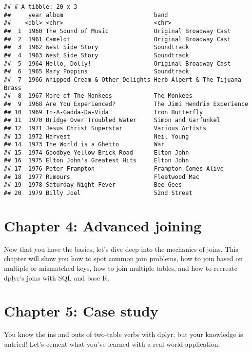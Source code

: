 \documentclass[]{article}
\begin{document}
\begin{verbatim}
## # A tibble: 20 x 3
##     year album                          band                           
##    <dbl> <chr>                          <chr>                          
##  1  1960 The Sound of Music             Original Broadway Cast         
##  2  1961 Camelot                        Original Broadway Cast         
##  3  1962 West Side Story                Soundtrack                     
##  4  1963 West Side Story                Soundtrack                     
##  5  1964 Hello, Dolly!                  Original Broadway Cast         
##  6  1965 Mary Poppins                   Soundtrack                     
##  7  1966 Whipped Cream & Other Delights Herb Alpert & The Tijuana Brass
##  8  1967 More of The Monkees            The Monkees                    
##  9  1968 Are You Experienced?           The Jimi Hendrix Experience    
## 10  1969 In-A-Gadda-Da-Vida             Iron Butterfly                 
## 11  1970 Bridge Over Troubled Water     Simon and Garfunkel            
## 12  1971 Jesus Christ Superstar         Various Artists                
## 13  1972 Harvest                        Neil Young                     
## 14  1973 The World is a Ghetto          War                            
## 15  1974 Goodbye Yellow Brick Road      Elton John                     
## 16  1975 Elton John's Greatest Hits     Elton John                     
## 17  1976 Peter Frampton                 Frampton Comes Alive           
## 18  1977 Rumours                        Fleetwood Mac                  
## 19  1978 Saturday Night Fever           Bee Gees                       
## 20  1979 Billy Joel                     52nd Street
\end{verbatim}

\section{Chapter 4: Advanced joining}\label{chapter-4-advanced-joining}

Now that you have the basics, let's dive deep into the mechanics of
joins. This chapter will show you how to spot common join problems, how
to join based on multiple or mismatched keys, how to join multiple
tables, and how to recreate dplyr's joins with SQL and base R.

\section{Chapter 5: Case study}\label{chapter-5-case-study}

You know the ins and outs of two-table verbs with dplyr, but your
knowledge is untried! Let's cement what you've learned with a real world
application.
\end{document}

